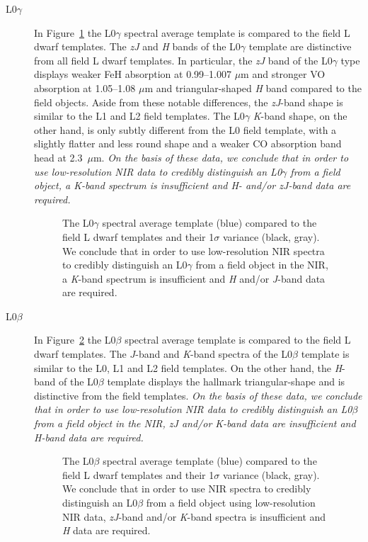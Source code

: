 \documentclass[12pt]{aastex6}
\begin{document}
\begin{description}
\item[L0$\gamma$]{
In Figure~\ref{fig:L0lg-field} the L0$\gamma$ spectral average template is compared to the field L dwarf templates.
The \emph{zJ} and \emph{H} bands of the L0$\gamma$ template are distinctive from all field L dwarf templates.
In particular, the \emph{zJ} band of the L0$\gamma$ type displays weaker FeH absorption at 0.99--1.007 $\mu$m and stronger VO absorption at 1.05--1.08 $\mu$m and triangular-shaped \emph{H} band compared to the field objects.
Aside from these notable differences, the \emph{zJ}-band shape is similar to the L1 and L2 field templates.
The L0$\gamma$ \emph{K}-band shape, on the other hand, is only subtly different from the L0 field template, with a slightly flatter and less round shape and a weaker CO absorption band head at 2.3~$\mu$m.
\emph{On the basis of these data, we conclude that in order to use low-resolution NIR data to credibly distinguish an L0$\gamma$ from a field object, a \emph{K}-band spectrum is insufficient and \emph{H}- and/or \emph{zJ}-band data are required.}
}

\begin{figure}[b]
    \caption{The L0$\gamma$ spectral average template (blue) compared to the field L dwarf templates and their 1$\sigma$ variance (black, gray). We conclude that in order to use low-resolution NIR spectra to credibly distinguish an L0$\gamma$ from a field object in the NIR, a \emph{K}-band spectrum is insufficient and \emph{H} and/or \emph{J}-band data are required.}
    \label{fig:L0lg-field}
\end{figure}
\clearpage

\item[L0$\beta$]{
In Figure~\ref{fig:L0b-field} the L0$\beta$ spectral average template is compared to the field L dwarf templates.
The $J$-band and \emph{K}-band spectra of the L0$\beta$ template is similar to the L0, L1 and L2 field templates.
On the other hand, the \emph{H}-band of the L0$\beta$ template displays the hallmark triangular-shape and is distinctive from the field templates.
\emph{On the basis of these data, we conclude that in order to use low-resolution NIR data to credibly distinguish an L0$\beta$ from a field object in the NIR, \emph{zJ} and/or \emph{K}-band data are insufficient and \emph{H}-band data are required.}
}

\begin{figure}[b]
    \caption{The L0$\beta$ spectral average template (blue) compared to the field L dwarf templates and their 1$\sigma$ variance (black, gray). We conclude that in order to use NIR spectra to credibly distinguish an L0$\beta$ from a field object using low-resolution NIR data, \emph{zJ}-band and/or \emph{K}-band spectra is insufficient and \emph{H} data are required.}
    \label{fig:L0b-field}
\end{figure}
\clearpage


\end{description}
\end{document}
